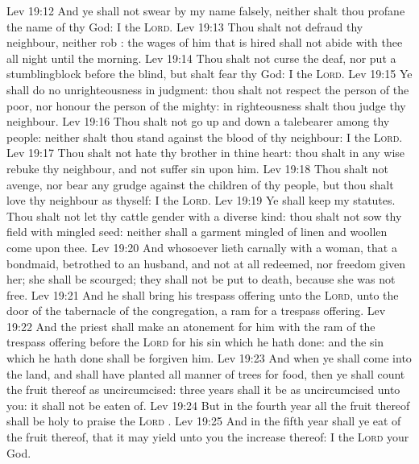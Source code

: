 \vs Lev 19:12 And ye shall not swear by my name falsely, neither shalt thou profane the name of thy God: I  the \textsc{Lord}.
\vs Lev 19:13 Thou shalt not defraud thy neighbour, neither rob : the wages of him that is hired shall not abide with thee all night until the morning.
\vs Lev 19:14 Thou shalt not curse the deaf, nor put a stumblingblock before the blind, but shalt fear thy God: I  the \textsc{Lord}.
\vs Lev 19:15 Ye shall do no unrighteousness in judgment: thou shalt not respect the person of the poor, nor honour the person of the mighty:  in righteousness shalt thou judge thy neighbour.
\vs Lev 19:16 Thou shalt not go up and down  a talebearer among thy people: neither shalt thou stand against the blood of thy neighbour: I  the \textsc{Lord}.
\vs Lev 19:17 Thou shalt not hate thy brother in thine heart: thou shalt in any wise rebuke thy neighbour, and not suffer sin upon him.
\vs Lev 19:18 Thou shalt not avenge, nor bear any grudge against the children of thy people, but thou shalt love thy neighbour as thyself: I  the \textsc{Lord}.
\vs Lev 19:19 Ye shall keep my statutes. Thou shalt not let thy cattle gender with a diverse kind: thou shalt not sow thy field with mingled seed: neither shall a garment mingled of linen and woollen come upon thee.
\vs Lev 19:20 And whosoever lieth carnally with a woman, that  a bondmaid, betrothed to an husband, and not at all redeemed, nor freedom given her; she shall be scourged; they shall not be put to death, because she was not free.
\vs Lev 19:21 And he shall bring his trespass offering unto the \textsc{Lord}, unto the door of the tabernacle of the congregation,  a ram for a trespass offering.
\vs Lev 19:22 And the priest shall make an atonement for him with the ram of the trespass offering before the \textsc{Lord} for his sin which he hath done: and the sin which he hath done shall be forgiven him.
\vs Lev 19:23 And when ye shall come into the land, and shall have planted all manner of trees for food, then ye shall count the fruit thereof as uncircumcised: three years shall it be as uncircumcised unto you: it shall not be eaten of.
\vs Lev 19:24 But in the fourth year all the fruit thereof shall be holy to praise the \textsc{Lord} .
\vs Lev 19:25 And in the fifth year shall ye eat of the fruit thereof, that it may yield unto you the increase thereof: I  the \textsc{Lord} your God.
